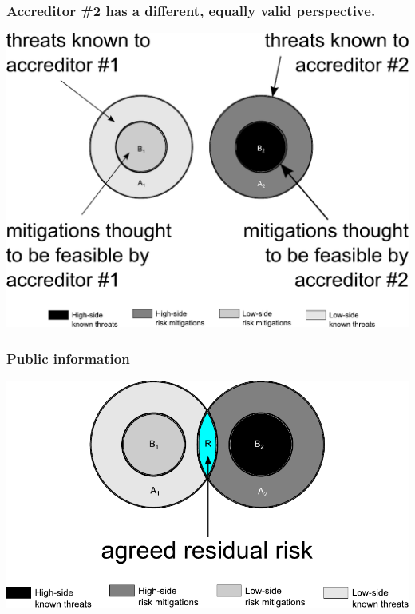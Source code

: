 \documentclass{beamer}
\begin{document}
\begin{frame}
	\frametitle{Accreditor \#2 has a different, equally valid perspective.}
	\begin{center}
		\includegraphics[width=\textwidth]{venn_diagrams_for_slides_2.pdf}
	\end{center}
\end{frame}

\begin{frame}
	\frametitle{Public information}
	\begin{center}
		\includegraphics[width=\textwidth]{venn_diagrams_for_slides_3.pdf}
	\end{center}
\end{frame}
\end{document}
